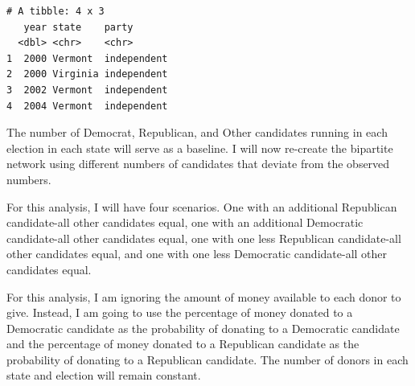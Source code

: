\documentclass[]{article}
\newenvironment{Shaded}{\begin{snugshade}}{\end{snugshade}}
\newcommand{\KeywordTok}[1]{\textcolor[rgb]{0.13,0.29,0.53}{\textbf{#1}}}
\newcommand{\StringTok}[1]{\textcolor[rgb]{0.31,0.60,0.02}{#1}}
\newcommand{\OperatorTok}[1]{\textcolor[rgb]{0.81,0.36,0.00}{\textbf{#1}}}
\newcommand{\NormalTok}[1]{#1}
\begin{document}
\begin{Shaded}
\end{Shaded}

\begin{verbatim}
# A tibble: 4 x 3
   year state    party      
  <dbl> <chr>    <chr>      
1  2000 Vermont  independent
2  2000 Virginia independent
3  2002 Vermont  independent
4  2004 Vermont  independent
\end{verbatim}

The number of Democrat, Republican, and Other candidates running in each
election in each state will serve as a baseline. I will now re-create
the bipartite network using different numbers of candidates that deviate
from the observed numbers.

For this analysis, I will have four scenarios. One with an additional
Republican candidate-all other candidates equal, one with an additional
Democratic candidate-all other candidates equal, one with one less
Republican candidate-all other candidates equal, and one with one less
Democratic candidate-all other candidates equal.

For this analysis, I am ignoring the amount of money available to each
donor to give. Instead, I am going to use the percentage of money
donated to a Democratic candidate as the probability of donating to a
Democratic candidate and the percentage of money donated to a Republican
candidate as the probability of donating to a Republican candidate. The
number of donors in each state and election will remain constant.
\end{document}
